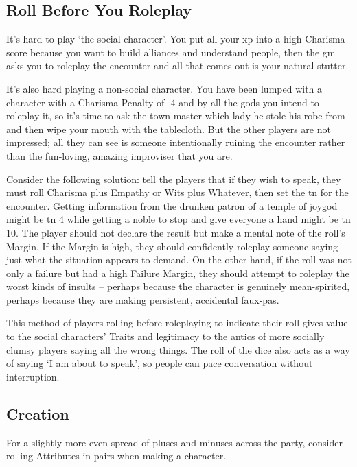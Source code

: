 \begin{multicols}{2}

\subsection{Roll Before You Roleplay}

It's hard to play `the social character'.
You put all your \gls{xp} into a high Charisma score because you want to build alliances and understand people, then the \gls{gm} asks you to roleplay the encounter and all that comes out is your natural stutter.

It's also hard playing a non-social character.
You have been lumped with a character with a Charisma Penalty of -4 and by all the gods you intend to roleplay it, so it's time to ask the town master which lady he stole his robe from and then wipe your mouth with the tablecloth.
But the other players are not impressed; all they can see is someone intentionally ruining the encounter rather than the fun-loving, amazing improviser that you are.

Consider the following solution: tell the players that if they wish to speak, they must roll Charisma plus Empathy or Wits plus Whatever, then set the \gls{tn} for the encounter.
Getting information from the drunken patron of a temple of \gls{joygod} might be \gls{tn} 4 while getting a noble to stop and give everyone a hand might be \gls{tn} 10.
The player should not declare the result but make a mental note of the roll's Margin.
If the Margin is high, they should confidently roleplay someone saying just what the situation appears to demand.
On the other hand, if the roll was not only a failure but had a high Failure Margin, they should attempt to roleplay the worst kinds of insults -- perhaps because the character is genuinely mean-spirited, perhaps because they are making persistent, accidental faux-pas.

This method of players rolling before roleplaying to indicate their roll gives value to the social characters' Traits and legitimacy to the antics of more socially clumsy players saying all the wrong things.
The roll of the dice also acts as a way of saying `I am about to speak', so people can pace conversation without interruption.


\subsection{ Creation}

For a slightly more even spread of pluses and minuses across the party, consider rolling Attributes in pairs when making a character.


\end{multicols}
